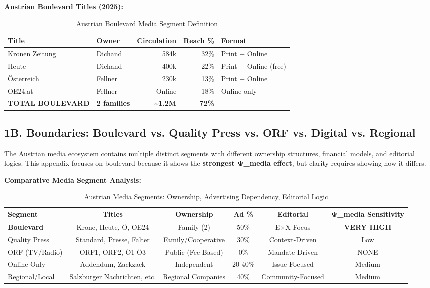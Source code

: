 \textbf{Austrian Boulevard Titles (2025):}

\begin{table}[h]
\centering
\caption{Austrian Boulevard Media Segment Definition}
\label{tab:dx-boulevard-definition}
\begin{tabular}{|l|l|r|r|l|}
\hline
\textbf{Title} & \textbf{Owner} & \textbf{Circulation} & \textbf{Reach \%} & \textbf{Format} \\
\hline
Kronen Zeitung & Dichand & 584k & 32\% & Print + Online \\
Heute & Dichand & 400k & 22\% & Print + Online (free) \\
Österreich & Fellner & 230k & 13\% & Print + Online \\
OE24.at & Fellner & Online & 18\% & Online-only \\
\hline
\textbf{TOTAL BOULEVARD} & \textbf{2 families} & \textbf{\sim1.2M} & \textbf{72\%} & \\
\hline
\end{tabular}
\end{table}

\label{sec:dx-media-boundaries}

\subsection*{1B. Boundaries: Boulevard vs. Quality Press vs. ORF vs. Digital vs. Regional}

The Austrian media ecosystem contains multiple distinct segments with different ownership
structures, financial models, and editorial logics. This appendix focuses on boulevard because
it shows the \textbf{strongest Ψ_media effect}, but clarity requires showing how it differs.

\textbf{Comparative Media Segment Analysis:}

\begin{table}[h]
\centering
\caption{Austrian Media Segments: Ownership, Advertising Dependency, Editorial Logic}
\label{tab:dx-media-segments}
\begin{tabular}{|l|c|c|c|c|c|}
\hline
\textbf{Segment} & \textbf{Titles} & \textbf{Ownership} & \textbf{Ad \%} & \textbf{Editorial} & \textbf{Ψ\_media Sensitivity} \\
\hline
\textbf{Boulevard} & Krone, Heute, Ö, OE24 & Family (2) & 50\% & E×X Focus & \textbf{VERY HIGH} \\
Quality Press & Standard, Presse, Falter & Family/Cooperative & 30\% & Context-Driven & Low \\
ORF (TV/Radio) & ORF1, ORF2, Ö1-Ö3 & Public (Fee-Based) & 0\% & Mandate-Driven & NONE \\
Online-Only & Addendum, Zackzack & Independent & 20-40\% & Issue-Focused & Medium \\
Regional/Local & Salzburger Nachrichten, etc. & Regional Companies & 40\% & Community-Focused & Medium \\
\hline
\end{tabular}
\end{table}

